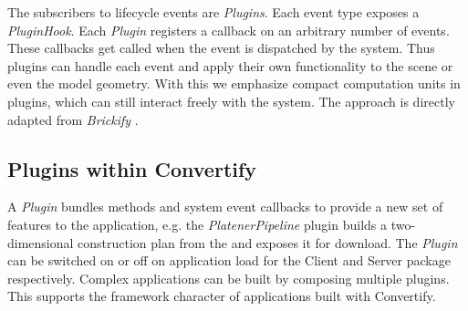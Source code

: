 \documentclass[../ClassicThesis.tex]{subfiles}
\begin{document}
The subscribers to lifecycle events are \emph{Plugins}. Each event type exposes
a \emph{PluginHook}. Each \emph{Plugin} registers a callback on an arbitrary
number of events. These callbacks get called when the event is dispatched by the
system. Thus plugins can handle each event and apply their own functionality to
the scene or even the model geometry. With this we emphasize compact computation
units in plugins, which can still interact freely with the system. The approach
is directly adapted from \emph{Brickify} .


\subsection{Plugins within Convertify}

A \emph{Plugin} bundles methods and system event callbacks to provide a new set
of features to the application, e.g. the \emph{PlatenerPipeline} plugin builds a
two-dimensional construction plan from the {\threedmodel} and exposes it for
download. The \emph{Plugin} can be switched on or off on application load for
the Client and Server package respectively. Complex applications can be built by
composing multiple plugins. This supports the framework character of
applications built with Convertify.




\end{document}
